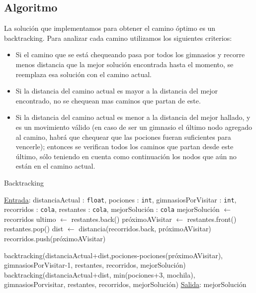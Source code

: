 \subsection{Algoritmo}

La solución que implementamos para obtener el camino óptimo es un backtracking. 
Para analizar cada camino utilizamos los siguientes criterios:
\begin{itemize}
    \item Si el camino que se está chequeando pasa por todos los gimnasios y recorre menos distancia que la mejor solución encontrada hasta el momento, se reemplaza esa solución con el camino actual.
    \item Si la distancia del camino actual es mayor a la distancia del mejor encontrado, no se chequean mas caminos que partan de este.
    \item Si la distancia del camino actual es menor a la distancia del mejor hallado, y es un movimiento válido (en caso de ser un gimnasio el último nodo agregado al camino, habrá que chequear que las pociones fueran suficientes para vencerle); entonces se verifican todos los caminos que partan desde este último, sólo teniendo en cuenta como continuación los nodos que aún no están en el camino actual.
\end{itemize}

\begin{algorithm}[H]
\label{}
\caption{Backtracking}
\begin{algorithmic}[1]
\Statex \underline{Entrada}: distanciaActual : \texttt{float}, pociones : \texttt{int}, gimnasiosPorVisitar : \texttt{int}, recorridos : \texttt{cola}, restantes : \texttt{cola}, mejorSoluci\'on : \texttt{cola}
\medskip
{}
        \State mejorSoluci\'on $\gets$ recorridos
    \EndIf
\Else
        \State ultimo $\gets$ restantes.back()
            \State pr\'oximoAVisitar $\gets$ restantes.front()
            \State restantes.pop()
            \State dist $\gets$ distancia(recorridos.back, pr\'oximoAVisitar)
            \State recorridos.push(pr\'oximoAVisitar)

                \State backtracking(distanciaActual+dist,pociones-pociones(pr\'oximoAVisitar), gimnasiosPorVisitar-1, restantes, recorridos, mejorSoluci\'on)
            \Else
                \State backtracking(distanciaActual+dist, min(pociones+3, mochila), gimnasiosPorvisitar, restantes, recorridos, mejorSoluci\'on)
            \EndIf
        \EndWhile
    \EndIf
\EndIf
\medskip
\Statex \underline{Salida}: mejorSoluci\'on
\end{algorithmic}
\end{algorithm}


